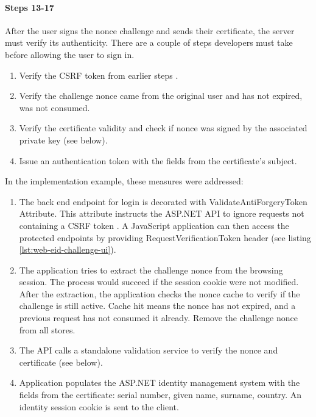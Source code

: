 \paragraph{Steps 13-17}

After the user signs the nonce challenge and sends their certificate, the server must verify its authenticity. There are a couple of steps developers must take before allowing the user to sign in.

\begin{enumerate}
    \item Verify the CSRF token from earlier steps \cite{ria-webeid-source-web-eid-authtoken-validation-java-readme}.
    \item Verify the challenge nonce came from the original user and has not expired, was not consumed.
    \item Verify the certificate validity and check if nonce was signed by the associated private key (see below).
    \item Issue an authentication token with the fields from the certificate's subject.
\end{enumerate}

In the implementation example, these measures were addressed:
\begin{enumerate}
    \item The back end endpoint for login is decorated with ValidateAntiForgeryToken Attribute. This attribute instructs the ASP.NET API to ignore requests not containing a CSRF token \cite{msdocs-anti-request-forgery}. A JavaScript application can then access the protected endpoints by providing RequestVerificationToken header (see listing \ref{lst:web-eid-challenge-ui}).
    \item The application tries to extract the challenge nonce from the browsing session. The process would succeed if the session cookie were not modified. After the extraction, the application checks the nonce cache to verify if the challenge is still active. Cache hit means the nonce has not expired, and a previous request has not consumed it already. Remove the challenge nonce from all stores.
    \item The API calls a standalone validation service to verify the nonce and certificate (see below).
    \item Application populates the ASP.NET identity management system with the fields from the certificate: serial number, given name, surname, country. An identity session cookie is sent to the client.
\end{enumerate}

